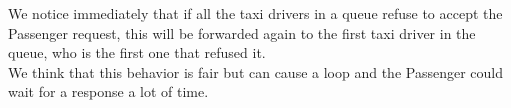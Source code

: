 We notice immediately that if all the taxi drivers in a queue refuse to accept the Passenger request, this will be forwarded again to the first taxi driver in the queue, who is the first one that refused it.
\\ We think that this behavior is fair but can cause a loop and the Passenger could wait for a response a lot of time.\\



